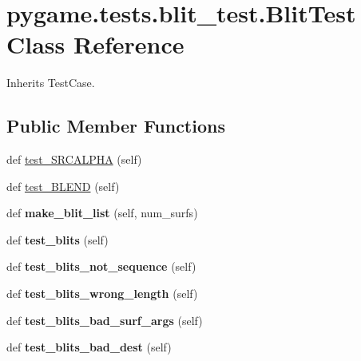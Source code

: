 \hypertarget{classpygame_1_1tests_1_1blit__test_1_1_blit_test}{}\section{pygame.\+tests.\+blit\+\_\+test.\+Blit\+Test Class Reference}
\label{classpygame_1_1tests_1_1blit__test_1_1_blit_test}


Inherits Test\+Case.

\subsection*{Public Member Functions}
\begin{DoxyCompactItemize}
\item 
def \hyperlink{classpygame_1_1tests_1_1blit__test_1_1_blit_test_a5eb98bc33fff52453d660e5cb4fd453e}{test\+\_\+\+S\+R\+C\+A\+L\+P\+HA} (self)
\item 
def \hyperlink{classpygame_1_1tests_1_1blit__test_1_1_blit_test_a923ed7436185a14e3548d614b65544c5}{test\+\_\+\+B\+L\+E\+ND} (self)
\item 
\mbox{\label{classpygame_1_1tests_1_1blit__test_1_1_blit_test_a19528e69691c62cd87b9360781bcf98b}} 
def {\bfseries make\+\_\+blit\+\_\+list} (self, num\+\_\+surfs)
\item 
\mbox{\label{classpygame_1_1tests_1_1blit__test_1_1_blit_test_afad13bce2c86d49acff29eec829c986e}} 
def {\bfseries test\+\_\+blits} (self)
\item 
\mbox{\label{classpygame_1_1tests_1_1blit__test_1_1_blit_test_a2fb77c18ae95236b94af31ae244e5da3}} 
def {\bfseries test\+\_\+blits\+\_\+not\+\_\+sequence} (self)
\item 
\mbox{\label{classpygame_1_1tests_1_1blit__test_1_1_blit_test_a50bf6026c634d1b846d16094d0e560d9}} 
def {\bfseries test\+\_\+blits\+\_\+wrong\+\_\+length} (self)
\item 
\mbox{\label{classpygame_1_1tests_1_1blit__test_1_1_blit_test_ad1e5a34d1e6eac8d18a064339c76dfd9}} 
def {\bfseries test\+\_\+blits\+\_\+bad\+\_\+surf\+\_\+args} (self)
\item 
\mbox{\label{classpygame_1_1tests_1_1blit__test_1_1_blit_test_a90e932f34d02a9018dc17f2636f20dd6}} 
def {\bfseries test\+\_\+blits\+\_\+bad\+\_\+dest} (self)
\end{DoxyCompactItemize}


